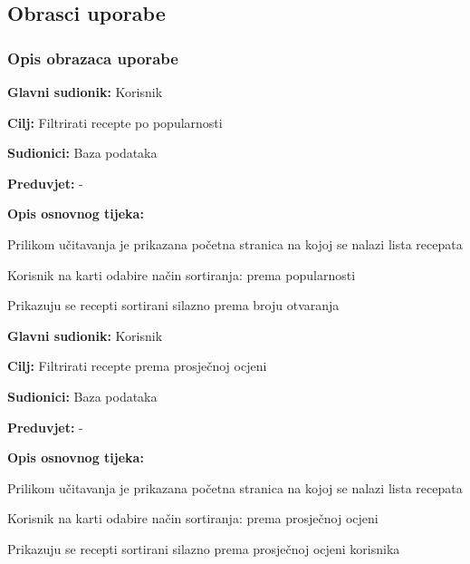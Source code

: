 \eject



\subsection{Obrasci uporabe}

\subsubsection{Opis obrazaca uporabe}

\noindent {}
\begin{packed_item}

	\item \textbf{Glavni sudionik: } Korisnik
	\item  \textbf{Cilj:} Filtrirati recepte po popularnosti
	\item  \textbf{Sudionici:} Baza podataka
	\item  \textbf{Preduvjet:} -
	\item  \textbf{Opis osnovnog tijeka:}

	\item[] \begin{packed_enum}

		\item Prilikom učitavanja je prikazana početna stranica na kojoj se nalazi lista recepata
		\item Korisnik na karti odabire način sortiranja: prema popularnosti
		\item Prikazuju se recepti sortirani silazno prema broju otvaranja

	\end{packed_enum}
\end{packed_item}

\noindent {}
\begin{packed_item}

	\item \textbf{Glavni sudionik: } Korisnik
	\item  \textbf{Cilj:} Filtrirati recepte prema prosječnoj ocjeni
	\item  \textbf{Sudionici:} Baza podataka
	\item  \textbf{Preduvjet:} -
	\item  \textbf{Opis osnovnog tijeka:}

	\item[] \begin{packed_enum}

		\item Prilikom učitavanja je prikazana početna stranica na kojoj se nalazi lista recepata
		\item Korisnik na karti odabire način sortiranja: prema prosječnoj ocjeni
		\item Prikazuju se recepti sortirani silazno prema prosječnoj ocjeni korisnika

	\end{packed_enum}
\end{packed_item}

